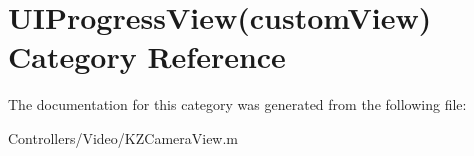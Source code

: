 \hypertarget{category_u_i_progress_view_07custom_view_08}{}\section{U\+I\+Progress\+View(custom\+View) Category Reference}
\label{category_u_i_progress_view_07custom_view_08}


The documentation for this category was generated from the following file\+:\begin{DoxyCompactItemize}
\item 
Controllers/\+Video/K\+Z\+Camera\+View.\+m\end{DoxyCompactItemize}
